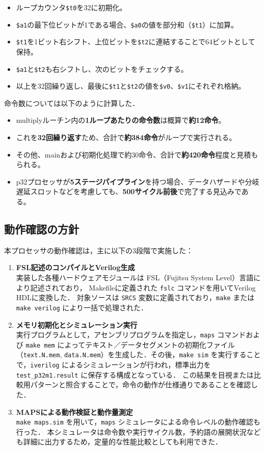 \documentclass[autodetect-engine,dvi=dvipdfmx,ja=standard,
               a4j,11pt]{bxjsarticle}
\begin{document}
\begin{itemize}
\item ループカウンタ\verb|$t0|を32に初期化。
\item \verb|$a1|の最下位ビットが1である場合、\verb|$a0|の値を部分和（\verb|$t1|）に加算。
\item \verb|$t1|を1ビット右シフト、上位ビットを\verb|$t2|に連結することで64ビットとして保持。
\item \verb|$a1|と\verb|$t2|も右シフトし、次のビットをチェックする。
\item 以上を32回繰り返し、最後に\verb|$t1|と\verb|$t2|の値を\verb|$v0|、\verb|$v1|にそれぞれ格納。
\end{itemize}
命令数については以下のように計算した．
\begin{itemize}
\item multiplyルーチン内の\textbf{1ループあたりの命令数}は概算で\textbf{約12命令}。
\item これを\textbf{32回繰り返す}ため、合計で\textbf{約384命令}がループで実行される。
\item その他、mainおよび初期化処理で約30命令、合計で\textbf{約420命令}程度と見積もられる。
\item p32プロセッサが\textbf{5ステージパイプライン}を持つ場合、データハザードや分岐遅延スロットなどを考慮しても、\textbf{500サイクル前後}で完了する見込みである。
\end{itemize}

\subsection{動作確認の方針}
本プロセッサの動作確認は，主に以下の3段階で実施した：

\begin{enumerate}
  \item \textbf{FSL記述のコンパイルとVerilog生成} \\
  実装した各種ハードウェアモジュールは FSL（Fujitsu System Level）言語により記述されており，
  Makefileに定義された \texttt{fslc} コマンドを用いてVerilog HDLに変換した．
  対象ソースは \texttt{SRCS} 変数に定義されており，\texttt{make} または
   \texttt{make verilog} により一括で処理された．

  \item \textbf{メモリ初期化とシミュレーション実行} \\
  実行プログラムとして，アセンブリプログラムを指定し，\texttt{maps} コマンドおよび
   \texttt{make mem} によってテキスト／データセグメントの初期化ファイル（\texttt{text.N.mem},
    \texttt{data.N.mem}）を生成した．その後，\texttt{make sim} を実行することで，\texttt{iverilog} 
    によるシミュレーションが行われ，標準出力を \texttt{test\_p32m1.result} に保存する構成となっている．
    この結果を目視または比較用パターンと照合することで，命令の動作が仕様通りであることを確認した．

  \item \textbf{MAPSによる動作検証と動作量測定} \\
  \texttt{make maps.sim} を用いて，\texttt{maps} シミュレータによる命令レベルの動作確認も行った．
  本シミュレータは命令数や実行サイクル数，予約語の展開状況なども詳細に出力するため，定量的な性能比較としても利用できた．
\end{enumerate}
\end{document}
